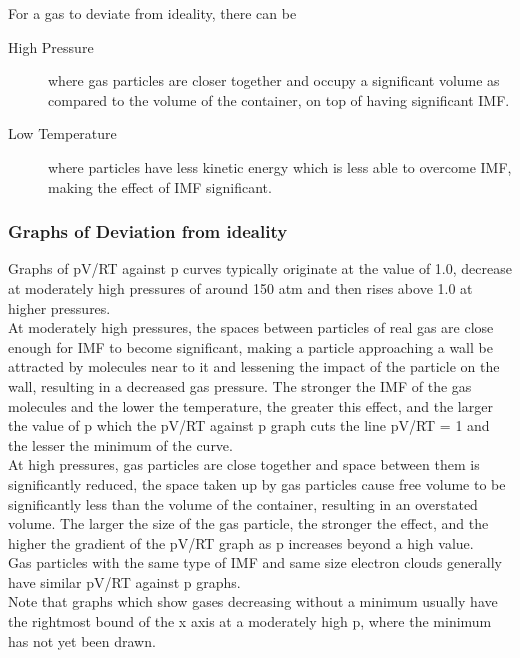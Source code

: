 \documentclass[../main]{subfiles}
\begin{document}
	For a gas to deviate from ideality, there can be 

	\begin{description}
		\item[High Pressure] where gas particles are closer together and occupy a significant volume as compared to the volume of the container, on top of having significant IMF.
		\item[Low Temperature] where particles have less kinetic energy which is less able to overcome IMF, making the effect of IMF significant.
	\end{description}

	\subsubsection{Graphs of Deviation from ideality}

	Graphs of pV/RT against p curves typically originate at the value of 1.0, decrease at moderately high pressures of around 150 atm and then rises above 1.0 at higher pressures. \\

	At moderately high pressures, the spaces between particles of real gas are close enough for IMF to become significant, making a particle approaching a wall be attracted by molecules near to it and lessening the impact of the particle on the wall, resulting in a decreased gas pressure. The stronger the IMF of the gas molecules and the lower the temperature, the greater this effect, and the larger the value of p which the pV/RT against p graph cuts the line pV/RT = 1 and the lesser the minimum of the curve. \\

	At high pressures, gas particles are close together and space between them is significantly reduced, the space taken up by gas particles cause free volume to be significantly less than the volume of the container, resulting in an overstated volume. The larger the size of the gas particle, the stronger the effect, and the higher the gradient of the pV/RT graph as p increases beyond a high value. \\

	Gas particles with the same type of IMF and same size electron clouds generally have similar pV/RT against p graphs. \\

	Note that graphs which show gases decreasing without a minimum usually have the rightmost bound of the x axis at a moderately high p, where the minimum has not yet been drawn.
\end{document}
